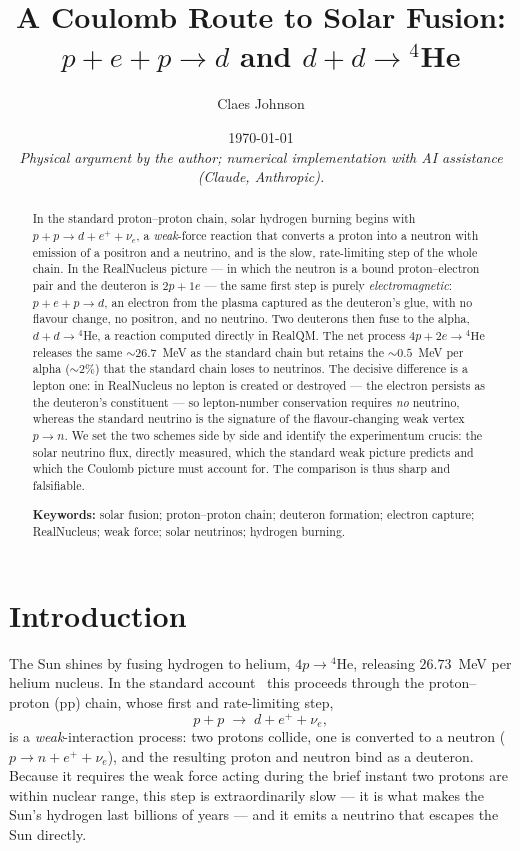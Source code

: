 \documentclass[11pt]{article}
\title{A Coulomb Route to Solar Fusion:\\
$p+e+p\to d$ and $d+d\to{}^4$He}
\author[1]{Claes Johnson}
\affil[1]{KTH Royal Institute of Technology, SE-100 44 Stockholm, Sweden \\
\texttt{claesjohnson@gmail.com}}
\date{\today \\[0.4em]
\small\textit{Physical argument by the author; numerical implementation with AI assistance (Claude, Anthropic).}}
\begin{document}
\maketitle

\begin{abstract}
In the standard proton--proton chain, solar hydrogen burning begins with $p+p\to d+e^{+}+\nu_e$, a
\emph{weak}-force reaction that converts a proton into a neutron with emission of a positron and a
neutrino, and is the slow, rate-limiting step of the whole chain. In the RealNucleus picture --- in
which the neutron is a bound proton--electron pair and the deuteron is $2p+1e$ --- the same first step
is purely \emph{electromagnetic}: $p+e+p\to d$, an electron from the plasma captured as the deuteron's
glue, with no flavour change, no positron, and no neutrino. Two deuterons then fuse to the alpha,
$d+d\to{}^4$He, a reaction computed directly in RealQM. The net process $4p+2e\to{}^4\mathrm{He}$
releases the same ${\sim}26.7$~MeV as the standard chain but retains the ${\sim}0.5$~MeV per alpha
(${\sim}2\%$) that the standard chain loses to neutrinos. The decisive difference is a lepton one: in
RealNucleus no lepton is created or destroyed --- the electron persists as the deuteron's constituent
--- so lepton-number conservation requires \emph{no} neutrino, whereas the standard neutrino is the
signature of the flavour-changing weak vertex $p\to n$. We set the two schemes side by side and
identify the experimentum crucis: the solar neutrino flux, directly measured, which the standard weak
picture predicts and which the Coulomb picture must account for. The comparison is thus sharp and
falsifiable.

\medskip
\noindent\textbf{Keywords:} solar fusion; proton--proton chain; deuteron formation; electron capture;
RealNucleus; weak force; solar neutrinos; hydrogen burning.
\end{abstract}


\section{Introduction}

The Sun shines by fusing hydrogen to helium, $4p\to{}^4\mathrm{He}$, releasing $26.73$~MeV per helium
nucleus. In the standard account~\cite{Bethe,Adelberger} this proceeds through the
proton--proton (pp) chain, whose first and rate-limiting step,
\begin{equation}
p + p \;\longrightarrow\; d + e^{+} + \nu_e ,
\label{eq:pp}
\end{equation}
is a \emph{weak}-interaction process: two protons collide, one is converted to a neutron
($p\to n + e^{+} + \nu_e$), and the resulting proton and neutron bind as a deuteron. Because it
requires the weak force acting during the brief instant two protons are within nuclear range, this
step is extraordinarily slow --- it is what makes the Sun's hydrogen last billions of years --- and it
emits a neutrino that escapes the Sun directly.
\end{document}
